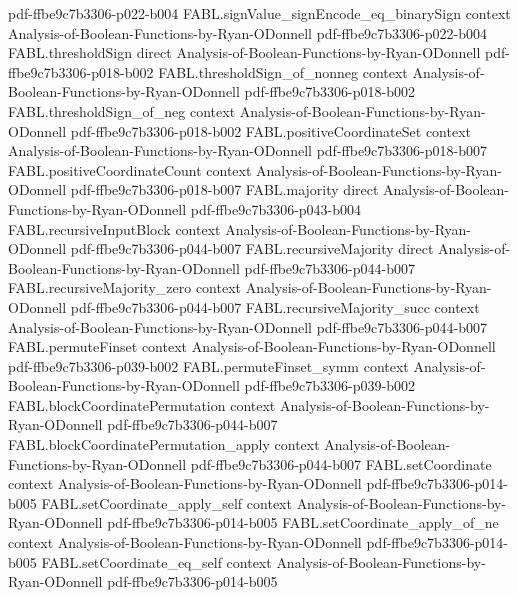 \begin{theorem}
  {pdf-ffbe9c7b3306-p022-b004}
\proofstep
  {FABL.signValue_signEncode_eq_binarySign}
  {context}
  {Analysis-of-Boolean-Functions-by-Ryan-ODonnell}
  {pdf-ffbe9c7b3306-p022-b004}
\proofstep
  {FABL.thresholdSign}
  {direct}
  {Analysis-of-Boolean-Functions-by-Ryan-ODonnell}
  {pdf-ffbe9c7b3306-p018-b002}
\proofstep
  {FABL.thresholdSign_of_nonneg}
  {context}
  {Analysis-of-Boolean-Functions-by-Ryan-ODonnell}
  {pdf-ffbe9c7b3306-p018-b002}
\proofstep
  {FABL.thresholdSign_of_neg}
  {context}
  {Analysis-of-Boolean-Functions-by-Ryan-ODonnell}
  {pdf-ffbe9c7b3306-p018-b002}
\proofstep
  {FABL.positiveCoordinateSet}
  {context}
  {Analysis-of-Boolean-Functions-by-Ryan-ODonnell}
  {pdf-ffbe9c7b3306-p018-b007}
\proofstep
  {FABL.positiveCoordinateCount}
  {context}
  {Analysis-of-Boolean-Functions-by-Ryan-ODonnell}
  {pdf-ffbe9c7b3306-p018-b007}
\proofstep
  {FABL.majority}
  {direct}
  {Analysis-of-Boolean-Functions-by-Ryan-ODonnell}
  {pdf-ffbe9c7b3306-p043-b004}
\proofstep
  {FABL.recursiveInputBlock}
  {context}
  {Analysis-of-Boolean-Functions-by-Ryan-ODonnell}
  {pdf-ffbe9c7b3306-p044-b007}
\proofstep
  {FABL.recursiveMajority}
  {direct}
  {Analysis-of-Boolean-Functions-by-Ryan-ODonnell}
  {pdf-ffbe9c7b3306-p044-b007}
\proofstep
  {FABL.recursiveMajority_zero}
  {context}
  {Analysis-of-Boolean-Functions-by-Ryan-ODonnell}
  {pdf-ffbe9c7b3306-p044-b007}
\proofstep
  {FABL.recursiveMajority_succ}
  {context}
  {Analysis-of-Boolean-Functions-by-Ryan-ODonnell}
  {pdf-ffbe9c7b3306-p044-b007}
\proofstep
  {FABL.permuteFinset}
  {context}
  {Analysis-of-Boolean-Functions-by-Ryan-ODonnell}
  {pdf-ffbe9c7b3306-p039-b002}
\proofstep
  {FABL.permuteFinset_symm}
  {context}
  {Analysis-of-Boolean-Functions-by-Ryan-ODonnell}
  {pdf-ffbe9c7b3306-p039-b002}
\proofstep
  {FABL.blockCoordinatePermutation}
  {context}
  {Analysis-of-Boolean-Functions-by-Ryan-ODonnell}
  {pdf-ffbe9c7b3306-p044-b007}
\proofstep
  {FABL.blockCoordinatePermutation_apply}
  {context}
  {Analysis-of-Boolean-Functions-by-Ryan-ODonnell}
  {pdf-ffbe9c7b3306-p044-b007}
\proofstep
  {FABL.setCoordinate}
  {context}
  {Analysis-of-Boolean-Functions-by-Ryan-ODonnell}
  {pdf-ffbe9c7b3306-p014-b005}
\proofstep
  {FABL.setCoordinate_apply_self}
  {context}
  {Analysis-of-Boolean-Functions-by-Ryan-ODonnell}
  {pdf-ffbe9c7b3306-p014-b005}
\proofstep
  {FABL.setCoordinate_apply_of_ne}
  {context}
  {Analysis-of-Boolean-Functions-by-Ryan-ODonnell}
  {pdf-ffbe9c7b3306-p014-b005}
\proofstep
  {FABL.setCoordinate_eq_self}
  {context}
  {Analysis-of-Boolean-Functions-by-Ryan-ODonnell}
  {pdf-ffbe9c7b3306-p014-b005}

\end{theorem}
